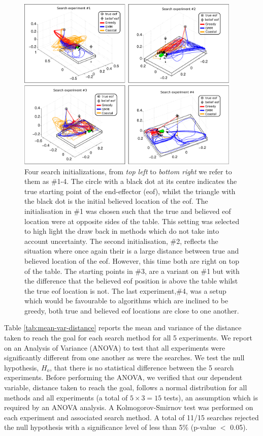 \begin{figure}
   \centering
 \includegraphics[width=0.95\textwidth]{./ch3-Search/Figures/Figure11}
\caption{Four search initializations, from \textit{top left} to \textit{bottom right} we refer to them as \#1-4. The 
circle with a black dot at its centre indicates the true starting point of the end-effector (eof), whilst the triangle with the black 
dot is the initial believed location of the eof.
The initialisation in \#1 was chosen such that the true and believed eof location were at opposite sides of the table. 
This setting was selected to high light the draw back in methods which do not take into account uncertainty. 
The second initialisation, \#2, reflects the situation where once again their is a large distance between true and believed location of 
the eof. However, this time both are right on top of the table. The starting points in \#3, are a variant on \#1 but 
with the difference that the believed eof position is above the table whilst the true eof location is not. The last 
experiment,\#4, was a setup which would be favourable to algorithms which are inclined to be greedy, both true and believed 
eof locations are close to one another.}
\label{fig:four-initialisations}
\end{figure}

Table \ref{tab:mean-var-distance} reports the mean and variance of the distance taken to reach the goal for each search method for all 5 experiments.
We report on an Analysis of Variance (ANOVA) to test that all experiments were 
significantly different from one another as were the searches. We test the null hypothesis,  $H_o$,  that there is 
no statistical difference between the 5 search experiments. 
Before performing the ANOVA, we verified that our dependent variable, distance taken to reach the goal, follows a normal 
distribution for all methods and all experiments (a total of $5 \times 3 = 15$ tests), an assumption which is required by 
an ANOVA analysis. A Kolmogorov-Smirnov test was performed on each experiment and associated search method. A total 
of 11/15 searches rejected the null hypothesis with a significance level of less than 5\% (p-value $<$ 0.05). 

